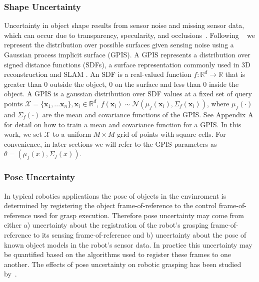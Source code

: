 \documentclass[journal,transmag]{IEEEtran}%
\newcommand{\bx}{\mathbf{x}}
\newcommand{\mX}{\mathcal{X}}
\newcommand{\mN}{\mathcal{N}}
\begin{document}
\subsubsection{Shape Uncertainty}

Uncertainty in object shape results from sensor noise and missing sensor data, which can occur due to transparency, specularity, and occlusions~\cite{mahler2015opt}.
Following ~\cite{laskey2015bandits, mahler2015opt} we represent the distribution over possible surfaces given sensing noise using a Gaussian process implicit surface (GPIS).
A GPIS represents a distribution over signed distance functions (SDFs), a surface representation commonly used in 3D reconstruction and SLAM \cite{}.
An SDF is a real-valued function $f: \mathbb{R}^d \rightarrow \mathbb{R}$ that is greater than 0 outside the object, 0 on the surface and less than 0 inside the object.
A GPIS is a gaussian distribution over SDF values at a fixed set of query points $\mX = \{\bx_1, ... \bx_n\}, \bx_i \in \mathbb{R}^d$, $f(\bx_i) \sim \mN(\mu_{f}(\bx_i),\Sigma_{f}(\bx_i))$, where $\mu_{f}(\cdot)$ and $\Sigma_{f}(\cdot)$ are the mean and covariance functions of the GPIS.
See Appendix A for detail on how to train a mean and covariance function for a GPIS.
In this work, we set $\mX$ to a uniform $M \times M$ grid of points with square cells.
For convenience, in later sections we will refer to the GPIS parameters as $\theta = \left( \mu_{f}(x), \Sigma_{f}(x) \right)$. 


\subsubsection{Pose Uncertainty}
In typical robotics applications the pose of objects in the envinroment is determined by registering the object frame-of-reference to the control frame-of-reference used for grasp execution.
Therefore pose uncertainty may come from either a) uncertainty about the registration of the robot's grasping frame-of-reference to its sensing frame-of-reference and b) uncertainty about the pose of known object models in the robot's sensor data.
In practice this uncertainty may be quantified based on the algorithms used to register these frames to one another.
The effects of pose uncertainty on robotic grasping has been studied by~\cite{weisz2012pose, kim2012physically}. %
\end{document}
